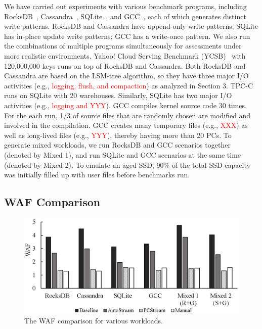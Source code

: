 We have carried out experiments with various benchmark programs, including
RocksDB~\cite{}, Cassandra~\cite{}, SQLite~\cite{}, and GCC~\cite{}, each of
which generates distinct write patterns.  RocksDB and Cassandra have
append-only write patterns; SQLite has in-place update write patterns; GCC has
a write-once pattern.  We also run the combinations of multiple programs
simultaneously for assessments under more realistic environments.  Yahoo! Cloud
Serving Benchmark (YCSB)~\cite{YCSB} with 120,000,000 keys runs on top of
RocksDB and Cassandra.  Both RocksDB and Cassandra are based on the LSM-tree
algorithm, so they have three major I/O activities (e.g.,
\textcolor{red}{logging, flush, and compaction}) as analyzed in Section 3.
TPC-C~\cite{TPCC} runs on SQLite with 20 warehouses.  Similarly, SQLite has two
major I/O activities (e.g., \textcolor{red}{logging and YYY}). 
GCC compiles kernel source code 30 times. For the each run, 1/3 of source files
that are randomly chosen are modified and involved in the compilation.  GCC
creates many temporary files (e.g., \textcolor{red}{XXX}) as well as long-lived
files (e.g., \textcolor{red}{YYY}), thereby having more than 20 PCs.  To
generate mixed workloads, we run RocksDB and GCC scenarios together (denoted by
Mixed 1), and run SQLite and GCC scenarios at the same time (denoted by Mixed
2).
To emulate an aged SSD, 90\% of the total SSD capacity was initially filled up
with user files before benchmarks run.


\subsection{WAF Comparison}

\begin{figure}[t]
	\centering
	\includegraphics[width=0.9\linewidth]{figure/waf}
	\caption{The WAF comparison for various workloads.}
	\label{fig:waf}
\end{figure}


